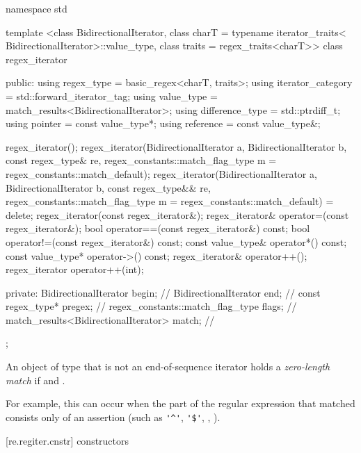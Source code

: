 \begin{codeblock}
namespace std {
  template <class BidirectionalIterator, 
            class charT = typename iterator_traits<
              BidirectionalIterator>::value_type,
            class traits = regex_traits<charT>>
  class regex_iterator {
  public:
     using regex_type        = basic_regex<charT, traits>;
     using iterator_category = std::forward_iterator_tag;
     using value_type        = match_results<BidirectionalIterator>;
     using difference_type   = std::ptrdiff_t;
     using pointer           = const value_type*;
     using reference         = const value_type&;

     regex_iterator();
     regex_iterator(BidirectionalIterator a, BidirectionalIterator b, 
                    const regex_type& re, 
                    regex_constants::match_flag_type m =
                      regex_constants::match_default);
     regex_iterator(BidirectionalIterator a, BidirectionalIterator b,
                    const regex_type&& re,
                    regex_constants::match_flag_type m =
                      regex_constants::match_default) = delete;
     regex_iterator(const regex_iterator&);
     regex_iterator& operator=(const regex_iterator&);
     bool operator==(const regex_iterator&) const;
     bool operator!=(const regex_iterator&) const;
     const value_type& operator*() const;
     const value_type* operator->() const;
     regex_iterator& operator++();
     regex_iterator operator++(int);

  private:
     BidirectionalIterator                begin;  // \expos
     BidirectionalIterator                end;    // \expos
     const regex_type*                    pregex; // \expos
     regex_constants::match_flag_type     flags;  // \expos
     match_results<BidirectionalIterator> match;  // \expos
  }; 
}
\end{codeblock}

\pnum
{}%
An object of type  that is not an end-of-sequence iterator
holds a \textit{zero-length match} if  and
. \begin{note} For
example, this can occur when the part of the regular expression that
matched consists only of an assertion (such as \verb|'^'|, \verb|'$'|, 
, ). \end{note}

[re.regiter.cnstr]{ constructors}


